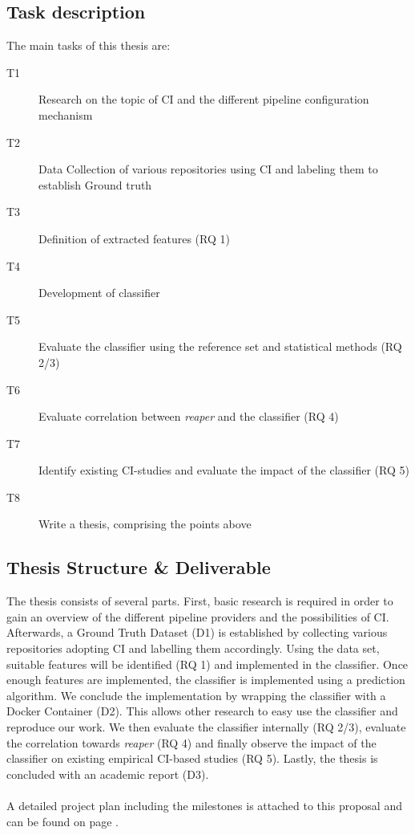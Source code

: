 \documentclass{task_description}
\begin{document}
\newpage
\subsection*{Task description}

The main tasks of this thesis are:

\begin{description}
\item[T1] Research on the topic of CI and the different pipeline configuration mechanism
\item[T2] Data Collection of various repositories using CI and labeling them to establish Ground truth
\item[T3] Definition of extracted features (RQ 1)
\item[T4] Development of classifier
\item[T5] Evaluate the classifier using the reference set and statistical methods (RQ 2/3)
\item[T6] Evaluate correlation between \emph{reaper} and the classifier (RQ 4)
\item[T7] Identify existing CI-studies and evaluate the impact of the classifier (RQ 5)
\item[T8] Write a thesis, comprising the points above
\end{description}

\subsection*{Thesis Structure \& Deliverable}

The thesis consists of several parts. First, basic research is required in order to gain an overview of the different pipeline providers and the possibilities of CI. Afterwards, a Ground Truth Dataset (D1) is established by collecting various repositories adopting CI and labelling them accordingly. Using the data set, suitable features will be identified (RQ 1) and implemented in the classifier. Once enough features are implemented, the classifier is implemented using a prediction algorithm. We conclude the implementation by wrapping the classifier with a Docker Container (D2). This allows other research to easy use the classifier and reproduce our work. We then evaluate the classifier internally (RQ 2/3), evaluate the correlation towards \textit{reaper} (RQ 4) and finally observe the impact of the classifier on existing empirical CI-based studies (RQ 5). Lastly, the thesis is concluded with an academic report (D3).
\\\\
A detailed project plan including the milestones is attached to this proposal and can be found on page \pageref{gantt}.
\end{document}
